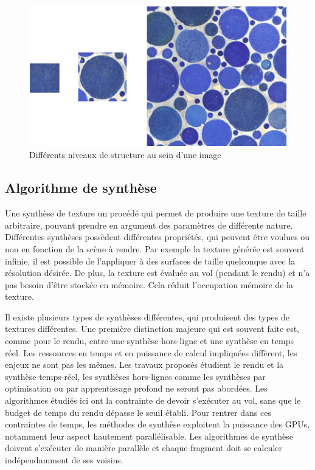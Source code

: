 \begin{figure}[h!]
    \centering
    \includegraphics[width=.85\linewidth]{contenu/resources/images/structure_level}
    \caption{Différents niveaux de structure au sein d'une image}
    \label{fig:structure-level}
\end{figure}

\subsection*{Algorithme de synthèse}

Une synthèse de texture un procédé qui permet de produire une texture de taille arbitraire, pouvant prendre en argument des paramètres de différente nature. Différentes synthèses possèdent différentes propriétés, qui peuvent être voulues ou non en fonction de la scène à rendre. Par exemple la texture générée est souvent infinie, il est possible de l'appliquer à des surfaces de taille quelconque avec la résolution désirée. De plus, la texture est évaluée au vol (pendant le rendu) et n'a pas besoin d'être stockée en mémoire. Cela réduit l'occupation mémoire de la texture.

\bigskip

Il existe plusieurs types de synthèses différentes, qui produisent des types de textures différentes. Une première distinction majeure qui est souvent faite est, comme pour le rendu, entre une synthèse hors-ligne et une synthèse en temps réel. Les ressources en temps et en puissance de calcul impliquées diffèrent, les enjeux ne sont pas les mêmes. Les travaux proposés étudient le rendu et la synthèse temps-réel, les synthèses hors-lignes comme les synthèses par optimisation ou par apprentissage profond ne seront pas abordées. Les algorithmes étudiés ici ont la contrainte de devoir s'exécuter au vol, sans que le budget de temps du rendu dépasse le seuil établi. Pour rentrer dans ces contraintes de temps, les méthodes de synthèse exploitent la puissance des GPUs, notamment leur aspect hautement parallélisable. Les algorithmes de synthèse doivent s'exécuter de manière parallèle et chaque fragment doit se calculer indépendamment de ses voisins.


